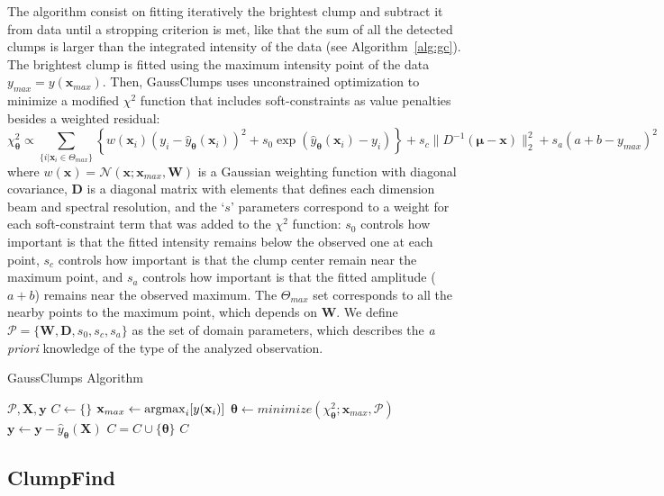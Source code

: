 \documentclass[manuscript]{aastex}
\newcommand{\vl}[1]{{\mathbf #1}}
\newcommand{\vs}[1]{{\boldsymbol #1}}
\newcommand{\argmax}{\operatornamewithlimits{argmax}}
\begin{document}
The algorithm consist on fitting iteratively the brightest clump and subtract it from data
until a stropping criterion is met, like that the sum of all the detected clumps
is larger than the integrated intensity of the data (see Algorithm~\ref{alg:gc}). The brightest clump is fitted using
the maximum intensity point of the data $y_{max} = y(\vl{x}_{max})$.
Then, GaussClumps uses unconstrained optimization to minimize a modified
$\chi^2$ function that includes soft-constraints as value penalties
besides a weighted residual:
\footnotesize
\begin{equation}
\chi^2_\vs{\theta} \propto \sum_{\{i | \vl{x}_i \in \Theta_{max} \}} \left\{ w(\vl{x}_i)(y_i -
\hat{y}_\vs{\theta}(\vl{x}_i))^2  +
s_0 \exp( \hat{y}_\vs{\theta}(\vl{x}_i) - y_i) \right\} + s_c \|D^{-1}(\vs{\mu} - \vl{x}) \|_2^2 
+ s_a\left(a + b - y_{max}\right)^2
\end{equation}
\normalsize
where
$w(\vl{x})=\mathcal{N}(\vl{x};\vl{x}_{max},\vl{W})$ is a Gaussian
weighting function with diagonal covariance, $\vl{D}$ is a diagonal matrix with elements
that defines each dimension beam and spectral resolution, and
the `$s$' parameters correspond to a weight for 
each soft-constraint term that was added to the $\chi^2$ function: 
$s_0$ controls how important is that the fitted intensity remains below the
observed one at each point, $s_c$ controls how important is that the clump center remain near the
maximum point, and $s_a$ controls how important is that the fitted amplitude
($a+b$) remains near the observed maximum. The $\Theta_{max}$ set corresponds to
all the nearby points to the maximum point, which depends on $\vl{W}$.
We define $\mathcal{P}=\{\vl{W},\vl{D},s_0,s_c,s_a\}$
as the set of domain parameters, which describes the \emph{a priori} knowledge of
the type of the analyzed observation.

\begin{algorithm}
\caption{GaussClumps Algorithm \citep{Stutzki90}}
\label{alg:gc}
\begin{algorithmic}
\REQUIRE $\mathcal{P},\vl{X},\vl{y}$
\STATE $C \leftarrow \{\}$
\REPEAT 
\STATE $\vl{x}_{max} \leftarrow \argmax_i[y(\vl{x}_i)]$
\STATE $\vs{\theta} \leftarrow minimize(\chi^2_\vs{\theta};\vl{x}_{max},\mathcal{P})$
\STATE $\vl{y} \leftarrow \vl{y} - \hat{y}_\vs{\theta}(\vl{X})$
\STATE $C = C \cup \{\vs{\theta}\}$
\UNTIL{$\|\vl{y}\|_1 \leq 0$}
\RETURN $C$
\end{algorithmic}
\end{algorithm}

\subsection{ClumpFind}
\end{document}
